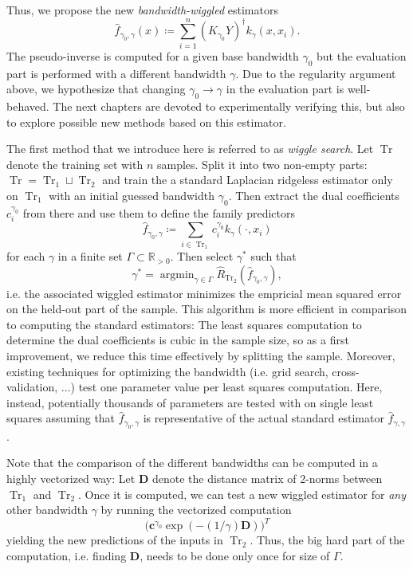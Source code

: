 \documentclass[12pt]{amsart}
\newcommand{\R}{\mathbb{R}}
\DeclareMathOperator{\Tr}{Tr}
\DeclareMathOperator{\argmin}{argmin}
\begin{document}
Thus, we propose the new \emph{bandwidth-wiggled} estimators
\[ \hat f_{\gamma_0, \gamma}(x) \coloneqq 
    \sum_{i=1}^n (K_{\gamma_0} Y)^\dagger k_\gamma(x, x_i). \]
The pseudo-inverse is computed for a given base bandwidth $\gamma_0$
but the evaluation part is performed with a different bandwidth $\gamma$.
Due to the regularity argument above, we hypothesize that 
changing $\gamma_0 \to \gamma$ in the evaluation part is well-behaved.
The next chapters are devoted to experimentally verifying this, but 
also to explore possible new methods based on this estimator.

The first method that we introduce here is referred to as 
\emph{wiggle search}.
Let $\Tr$ denote the training set with $n$ samples.
Split it into two non-empty parts: $\Tr = \Tr_1 \sqcup \Tr_2$
and train the a standard Laplacian ridgeless estimator only on
$\Tr_1$ with an initial guessed bandwidth $\gamma_0$.
Then extract the dual coefficients $c_i^{\gamma_0}$ from there 
and use them to define the family predictors 
\[ \hat f_{\gamma_0,\gamma} 
    \coloneqq \sum_{i \in \Tr_1} c_i^{\gamma_0} k_\gamma(\cdot, x_i) \]
for each $\gamma$ in a finite set $\Gamma \subset \R_{> 0}$.
Then select $\gamma^*$ such that 
\[ \gamma^* = \argmin_{\gamma \in \Gamma} 
    \hat R_{\Tr_2} \left(\hat f_{\gamma_0,\gamma}\right), \]
i.e. the associated wiggled estimator minimizes the empricial mean
squared error on the held-out part of the sample.
This algorithm is more efficient in comparison to computing the 
standard estimators:
The least squares computation to determine the dual coefficients is
cubic in the sample size, so as a first improvement, we reduce this 
time effectively by splitting the sample.
Moreover, existing techniques for optimizing the bandwidth
(i.e. grid search, cross-validation, ...) test one parameter value 
per least squares computation.
Here, instead, potentially thousands of parameters are tested with 
on single least squares assuming that $\hat f_{\gamma_0,\gamma}$ 
is representative of the actual standard estimator 
$\hat f_{\gamma,\gamma}$.

Note that the comparison of the different bandwidths can be computed 
in a highly vectorized way:
Let $\mathbf D$ denote the distance matrix of 2-norms between $\Tr_1$ and 
$\Tr_2$.
Once it is computed, we can test a new wiggled estimator 
for \emph{any} other bandwidth $\gamma$ by running
the vectorized computation
\[ \big( \mathbf c^{\gamma_0} \exp(-(1/\gamma) \mathbf D) \big)^T \]
yielding the new predictions of the inputs in $\Tr_2$.
Thus, the big hard part of the computation, i.e. finding $\mathbf D$,
needs to be done only once for size of $\Gamma$.
\end{document}
